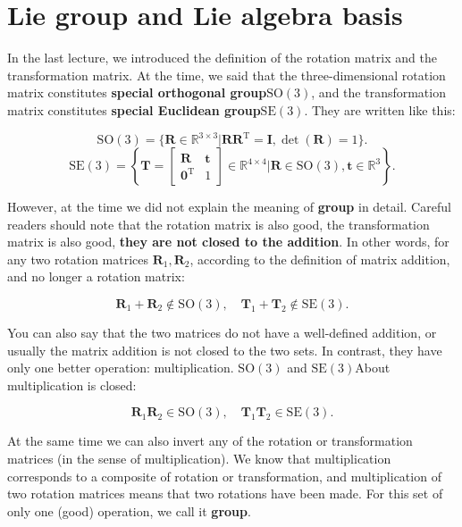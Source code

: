 \section{Lie group and Lie algebra basis}
In the last lecture, we introduced the definition of the rotation matrix and the transformation matrix. At the time, we said that the three-dimensional rotation matrix constitutes \textbf{special orthogonal group}$\mathrm{SO}(3)$, and the transformation matrix constitutes \textbf{special Euclidean group}$\mathrm{SE}(3) $. They are written like this:

\begin{equation}
\mathrm{SO}(3) = \{ \bm{R} \in \mathbb{R}^{3 \times 3} | \bm{R R}^\mathrm{T} = \bm{I}, \det(\bm{R})=1 \}.
\end{equation}
\begin{equation}
\mathrm{SE}(3) = \left\{ \bm{T} = \left[ {\begin{array}{*{20}{c}}
	\bm{R} & \bm{t} \\
	{{\bm{0}^\mathrm{T}}} & 1
	\end{array}} \right]
\in \mathbb{R}^{4 \times 4} | \bm{R} \in \mathrm{SO}(3), \bm{t} \in \mathbb{R}^3\right\}.
\end{equation}

However, at the time we did not explain the meaning of \textbf{group} in detail. Careful readers should note that the rotation matrix is also good, the transformation matrix is also good, \textbf{they are not closed to the addition}. In other words, for any two rotation matrices $\bm{R}_1, \bm{R}_2$, according to the definition of matrix addition, and no longer a rotation matrix:

\begin{equation}
\bm{R}_1 + \bm{R}_2  \notin \mathrm{SO}(3), \quad \bm{T}_1 + \bm{T}_2  \notin \mathrm{SE}(3).
\end{equation}

You can also say that the two matrices do not have a well-defined addition, or usually the matrix addition is not closed to the two sets. In contrast, they have only one better operation: multiplication. $\mathrm{SO}(3)$ and $\mathrm{SE}(3)$About multiplication is closed:

\begin{equation}
\bm{R}_1 \bm{R}_2  \in \mathrm{SO}(3), \quad \bm{T}_1 \bm{T}_2  \in \mathrm{SE}(3).
\end{equation}

At the same time we can also invert any of the rotation or transformation matrices (in the sense of multiplication). We know that multiplication corresponds to a composite of rotation or transformation, and multiplication of two rotation matrices means that two rotations have been made. For this set of only one (good) operation, we call it \textbf{group}.










